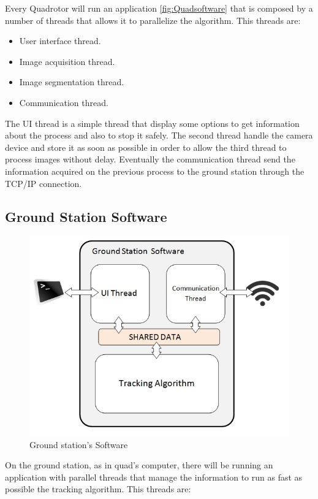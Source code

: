 	Every Quadrotor will run an application \ref{fig:Quadsoftware} that is composed by a number of threads that allows it to parallelize the algorithm. This threads are:
	
	
	\begin{itemize}
		\item User interface thread.
		\item Image acquisition thread.
		\item Image segmentation thread.
		\item Communication thread.
	\end{itemize}
	
	
	
	The UI thread is a simple thread that display some options to get information about the process and also to stop it safely. The second thread handle the camera device and store it as soon as possible in order to allow the third thread to process images without delay. Eventually the communication thread send the information acquired on the previous process to the ground station through the TCP/IP connection.
	
\subsection{Ground Station Software}
	\begin{figure}[hp]
		\begin{center}
			\includegraphics[width=0.7\linewidth]{../Images/c2/GroundStationsoftware}
		\end{center}
		\caption{Ground station's Software}
		\label{fig:GroundStation}
	\end{figure}

	On the ground station, as in quad's computer, there will be running an application with parallel threads that manage the information to run as fast as possible the tracking algorithm. This threads are:

